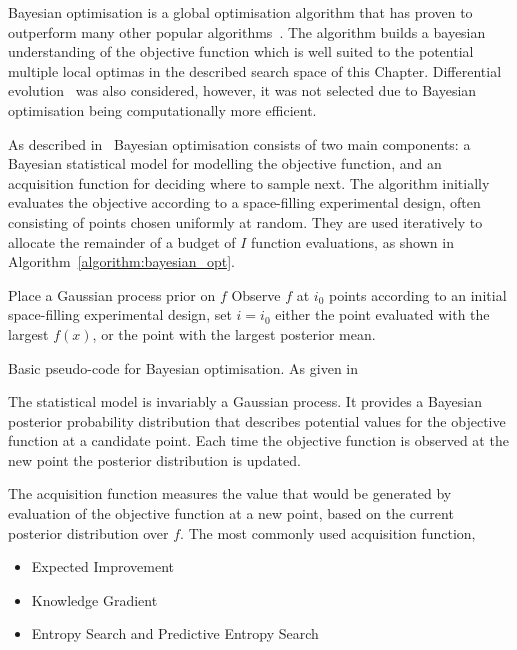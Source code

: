 Bayesian optimisation is a global optimisation
algorithm that has proven to outperform many other popular
algorithms~\cite{Jones2001}. The algorithm builds a bayesian understanding of
the objective function which is well suited to the potential multiple local optimas in
the described search space of this Chapter. Differential evolution~\cite{Storn1997}
was also considered, however, it was not selected due to Bayesian optimisation being
computationally more efficient.

As described in~\cite{Frazier2018} Bayesian optimisation consists of two main
components: a Bayesian statistical model for modelling the objective function,
and an acquisition function for deciding where to sample next. The algorithm
initially evaluates the objective according to a space-filling experimental
design, often consisting of points chosen uniformly at random. They are used
iteratively to allocate the remainder of a budget of \(I\) function evaluations, as
shown in Algorithm~\ref{algorithm:bayesian_opt}.

\begin{algorithm}[H]
Place a Gaussian process prior on \(f\)\;
Observe \(f\) at \(i_0\) points according to an initial space-filling experimental design, set \(i = i_0\) \;
\Return either the point evaluated with the largest \(f(x)\), or the point with the largest posterior mean.
\caption{Basic pseudo-code for Bayesian optimisation. As given in~\cite{Frazier2018}}\label{algorithm:bayesian_opt}
\end{algorithm}

The statistical model is invariably a Gaussian process. It provides a Bayesian
posterior probability distribution that describes potential values for the
objective function at a candidate point. Each time the objective function is
observed at the new point the posterior distribution is updated.

The acquisition function measures the value that would be generated by
evaluation of the objective function at a new point, based on the current
posterior distribution over \(f\). The most commonly used acquisition function,

\begin{itemize}
    \item Expected Improvement~\cite{Jones1998}
    \item Knowledge Gradient~\cite{Frazier2009}
    \item Entropy Search and Predictive Entropy Search~\cite{Hennig2012}
\end{itemize}


